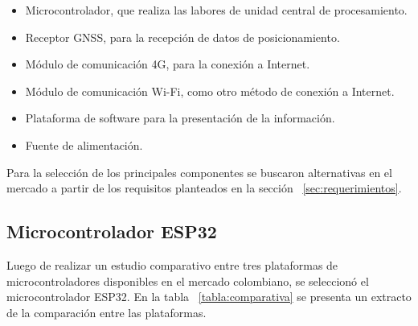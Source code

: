 \begin{itemize}
    \item Microcontrolador, que realiza las labores de unidad central de procesamiento.
    \item Receptor GNSS, para la recepción de datos de posicionamiento.
    \item Módulo de comunicación 4G, para la conexión a Internet.
    \item Módulo de comunicación Wi-Fi, como otro método de conexión a Internet. 
    \item Plataforma de software para la presentación de la información. 
    \item Fuente de alimentación.
\end{itemize}

Para la selección de los principales componentes se buscaron alternativas en el mercado a partir de los requisitos planteados en la sección ~\ref{sec:requerimientos}.

\subsection{Microcontrolador ESP32}
\label{Microcontrolador}

Luego de realizar un estudio comparativo entre tres plataformas de microcontroladores disponibles en el mercado colombiano, se seleccionó el microcontrolador ESP32. En la tabla ~\ref{tabla:comparativa} se presenta un extracto de la comparación entre las plataformas. 

